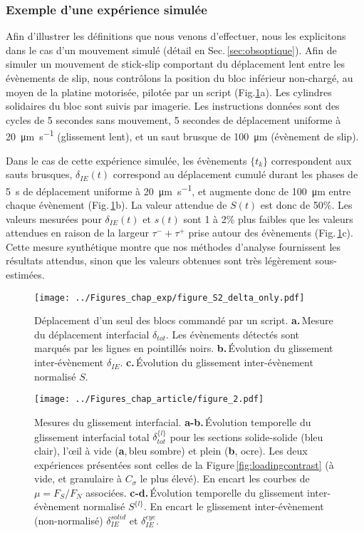 \subsubsection{Exemple d'une expérience simulée}



Afin d'illustrer les définitions que nous venons d'effectuer, nous les explicitons dans le cas d'un mouvement simulé (détail en Sec.\,\ref{sec:obsoptique}). Afin de simuler un mouvement de stick-slip comportant du déplacement lent entre les évènements de slip, nous contrôlons la position du bloc inférieur non-chargé, au moyen de la platine motorisée, pilotée par un script (Fig.\ref{fig:deltaart}a). Les cylindres solidaires du bloc sont suivis par imagerie. Les instructions données sont des cycles de 5 secondes sans mouvement, 5 secondes de déplacement uniforme à \SI{20}{\micro\meter\per\second} (glissement lent), et un saut brusque de \SI{100}{\micro\meter} (évènement de slip).

Dans le cas de cette expérience simulée, les évènements $\{t_k\}$ correspondent aux sauts brusques, $\delta_{IE}(t)$ correspond au déplacement cumulé durant les phases de \SI{5}{\second} de déplacement uniforme à \SI{20}{\micro\meter\per\second}, et augmente donc de \SI{100}{\micro\meter} entre chaque évènement (Fig.\,\ref{fig:deltaart}b). La valeur attendue de $S(t)$ est donc de 50\%. Les valeurs mesurées pour $\delta_{IE}(t)$ et $s(t)$ sont 1 à 2\% plus faibles que les valeurs attendues en raison de la largeur $\tau^-+\tau^+$ prise autour des évènements (Fig.\,\ref{fig:deltaart}c). Cette mesure synthétique montre que nos méthodes d'analyse fournissent les résultats attendus, sinon que les valeurs obtenues sont très légèrement sous-estimées.




\begin{figure}[p]
\texttt{[image: ../Figures\_chap\_exp/figure\_S2\_delta\_only.pdf]}
\caption[Exemple de mouvement scripté]{Déplacement d'un seul des blocs commandé par un script. \textbf{a.}\,Mesure du déplacement interfacial $\delta_{tot}$. Les évènements détectés sont marqués par les lignes en pointillés noirs. \textbf{b.}\,Évolution du glissement inter-évènement $\delta_{IE}$. \textbf{c.}\,Évolution du glissement inter-évènement normalisé $S$.}
\label{fig:deltaart}
\end{figure}

\begin{figure}[p]
\centering
\texttt{[image: ../Figures\_chap\_article/figure\_2.pdf]}
\caption[Mesures du glissement interfacial]{Mesures du glissement interfacial. \textbf{a-b.}\,Évolution temporelle du glissement interfacial total $\delta_{tot}^{\{l\}}$ pour les sections solide-solide (bleu clair), l'œil à vide (\textbf{a},\,bleu sombre) et plein (\textbf{b}, ocre). Les deux expériences présentées sont celles de la Figure\,\ref{fig:loadingcontrast} (à vide, et granulaire à $C_\sigma$ le plus élevé). En encart les courbes de $\mu=F_S/F_N$ associées. \textbf{c-d.}\,Évolution temporelle du glissement inter-évènement normalisé $S^{\{l\}}$. En encart le glissement inter-évènement (non-normalisé) $\delta_{IE}^{solid}$ et $\delta_{IE}^{eye}$.}
\label{fig:papier2}
\end{figure}


